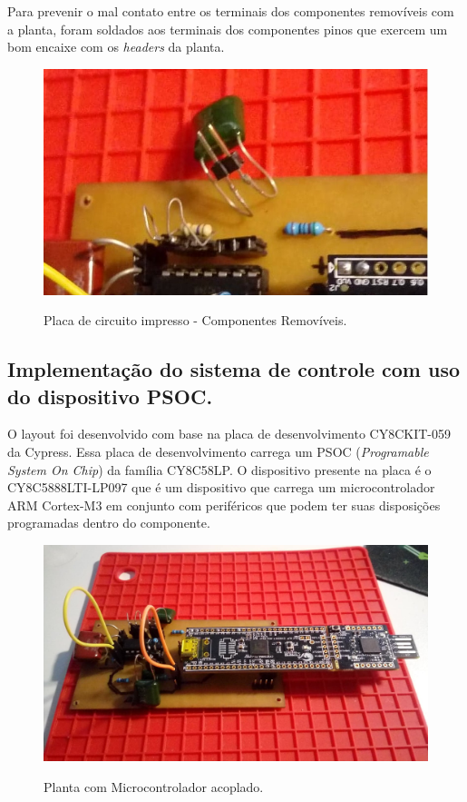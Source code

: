 \documentclass[
	article,			%
	11pt,				%
	oneside,			%
	a4paper,			%
	english,			%
	brazil,				%
	sumario=tradicional
	]{abntex2}
\begin{document}
Para prevenir o mal contato entre os terminais dos componentes removíveis com a planta, foram soldados aos terminais dos componentes pinos que exercem um bom encaixe com os \textit{headers} da planta.
\begin{figure}[htb!]
	\centering
	\caption{Placa de circuito impresso - Componentes Removíveis.}
	\includegraphics[scale=0.7]{./img/plantaMontagem_3.jpg}
	\label{fig:plantaMontagem_3}
\end{figure}

\pagebreak

\subsection{Implementação do sistema de controle com uso do dispositivo PSOC.}
\label{sec:implement_psoc}
O layout foi desenvolvido com base na placa de desenvolvimento CY8CKIT-059 da Cypress. 
Essa placa de desenvolvimento carrega um PSOC (\textit{Programable System On Chip}) da família CY8C58LP.
O dispositivo presente na placa é o CY8C5888LTI-LP097 que é um dispositivo que carrega um microcontrolador ARM Cortex-M3 em conjunto com periféricos que podem ter suas disposições programadas dentro do componente.

\begin{figure}[htb!]
	\centering
	\caption{Planta com Microcontrolador acoplado.}
	\includegraphics[scale=0.14]{./img/plantaMontagem_1.jpg}
	\label{fig:plantaMontagem_1}
\end{figure}
\end{document}
